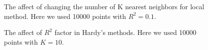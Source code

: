 \documentclass[12pt]{article}
\begin{document}
\begin{figure}[!tbh]
\centering        
   \caption{The affect of changing the number of K nearest neighbors for local method. Here we used 10000 points with $R^{2}=0.1$.}
   \label{fig:k1}
\end{figure} 	 	        


\begin{figure}[!tbh]
\centering        
   \caption{The affect of $R^{2}$ factor in Hardy's methods. Here we used 10000 points with $K=10$.}
   \label{fig:r21}
\end{figure} 	    
	        
	        	        
\end{document}
